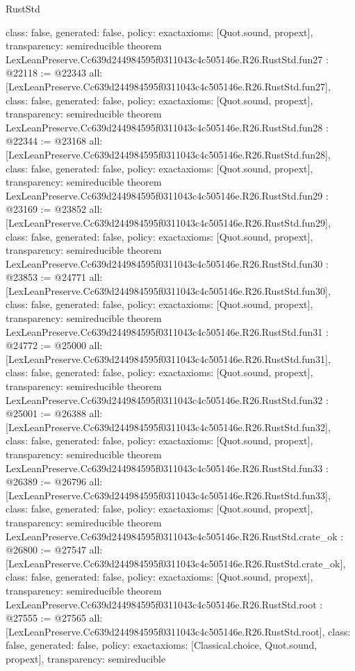 \begin{lexlean}{RustStd}
\begin{coremodule}
{  class: false,
  generated: false,
  policy: exact{axioms: [Quot.sound, propext]},
  transparency: semireducible
}
theorem LexLeanPreserve.Cc639d244984595f0311043c4c505146e.R26.RustStd.fun27 : @22118 := @22343 {
  all: [LexLeanPreserve.Cc639d244984595f0311043c4c505146e.R26.RustStd.fun27],
  class: false,
  generated: false,
  policy: exact{axioms: [Quot.sound, propext]},
  transparency: semireducible
}
theorem LexLeanPreserve.Cc639d244984595f0311043c4c505146e.R26.RustStd.fun28 : @22344 := @23168 {
  all: [LexLeanPreserve.Cc639d244984595f0311043c4c505146e.R26.RustStd.fun28],
  class: false,
  generated: false,
  policy: exact{axioms: [Quot.sound, propext]},
  transparency: semireducible
}
theorem LexLeanPreserve.Cc639d244984595f0311043c4c505146e.R26.RustStd.fun29 : @23169 := @23852 {
  all: [LexLeanPreserve.Cc639d244984595f0311043c4c505146e.R26.RustStd.fun29],
  class: false,
  generated: false,
  policy: exact{axioms: [Quot.sound, propext]},
  transparency: semireducible
}
theorem LexLeanPreserve.Cc639d244984595f0311043c4c505146e.R26.RustStd.fun30 : @23853 := @24771 {
  all: [LexLeanPreserve.Cc639d244984595f0311043c4c505146e.R26.RustStd.fun30],
  class: false,
  generated: false,
  policy: exact{axioms: [Quot.sound, propext]},
  transparency: semireducible
}
theorem LexLeanPreserve.Cc639d244984595f0311043c4c505146e.R26.RustStd.fun31 : @24772 := @25000 {
  all: [LexLeanPreserve.Cc639d244984595f0311043c4c505146e.R26.RustStd.fun31],
  class: false,
  generated: false,
  policy: exact{axioms: [Quot.sound, propext]},
  transparency: semireducible
}
theorem LexLeanPreserve.Cc639d244984595f0311043c4c505146e.R26.RustStd.fun32 : @25001 := @26388 {
  all: [LexLeanPreserve.Cc639d244984595f0311043c4c505146e.R26.RustStd.fun32],
  class: false,
  generated: false,
  policy: exact{axioms: [Quot.sound, propext]},
  transparency: semireducible
}
theorem LexLeanPreserve.Cc639d244984595f0311043c4c505146e.R26.RustStd.fun33 : @26389 := @26796 {
  all: [LexLeanPreserve.Cc639d244984595f0311043c4c505146e.R26.RustStd.fun33],
  class: false,
  generated: false,
  policy: exact{axioms: [Quot.sound, propext]},
  transparency: semireducible
}
theorem LexLeanPreserve.Cc639d244984595f0311043c4c505146e.R26.RustStd.crate_ok : @26800 := @27547 {
  all: [LexLeanPreserve.Cc639d244984595f0311043c4c505146e.R26.RustStd.crate_ok],
  class: false,
  generated: false,
  policy: exact{axioms: [Quot.sound, propext]},
  transparency: semireducible
}
theorem LexLeanPreserve.Cc639d244984595f0311043c4c505146e.R26.RustStd.root : @27555 := @27565 {
  all: [LexLeanPreserve.Cc639d244984595f0311043c4c505146e.R26.RustStd.root],
  class: false,
  generated: false,
  policy: exact{axioms: [Classical.choice, Quot.sound, propext]},
  transparency: semireducible
}


\end{coremodule}
\end{lexlean}
